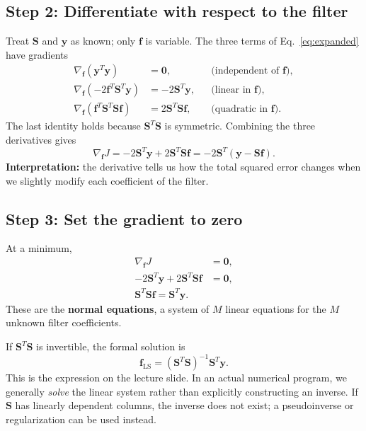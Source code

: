 \documentclass[11pt,letterpaper]{article}
\newcommand{\Smat}{\mathbf{S}}
\newcommand{\fvec}{\mathbf{f}}
\newcommand{\yvec}{\mathbf{y}}
\begin{document}
\subsection*{Step 2: Differentiate with respect to the filter}
Treat $\Smat$ and $\yvec$ as known; only $\fvec$ is variable.
The three terms of Eq.~\eqref{eq:expanded} have gradients
\begin{align}
\nabla_{\fvec}(\yvec^T\yvec)&=\mathbf{0},
&&\text{(independent of $\fvec$)},\\
\nabla_{\fvec}(-2\fvec^T\Smat^T\yvec)&=-2\Smat^T\yvec,
&&\text{(linear in $\fvec$)},\\
\nabla_{\fvec}(\fvec^T\Smat^T\Smat\fvec)&=2\Smat^T\Smat\fvec,
&&\text{(quadratic in $\fvec$)}.
\end{align}
The last identity holds because $\Smat^T\Smat$ is symmetric.
Combining the three derivatives gives
\begin{equation}
    \boxed{\nabla_{\fvec}J
    =-2\Smat^T\yvec+2\Smat^T\Smat\fvec
    =-2\Smat^T(\yvec-\Smat\fvec).}
    \label{eq:gradient}
\end{equation}
\textbf{Interpretation:} the derivative tells us how the total squared error
changes when we slightly modify each coefficient of the filter.

\subsection*{Step 3: Set the gradient to zero}
At a minimum,
\begin{align}
\nabla_{\fvec}J&=\mathbf{0},\\
-2\Smat^T\yvec+2\Smat^T\Smat\fvec&=\mathbf{0},\\
\boxed{\Smat^T\Smat\fvec=\Smat^T\yvec.}
\label{eq:normal}
\end{align}
These are the \textbf{normal equations}, a system of $M$ linear equations
for the $M$ unknown filter coefficients.

If $\Smat^T\Smat$ is invertible, the formal solution is
\begin{equation}
    \boxed{\fvec_{\mathrm{LS}}=(\Smat^T\Smat)^{-1}\Smat^T\yvec.}
    \label{eq:solution}
\end{equation}
This is the expression on the lecture slide. In an actual numerical program,
we generally \emph{solve} the linear system rather than explicitly constructing
an inverse. If $\Smat$ has linearly dependent columns, the inverse does not exist;
a pseudoinverse or regularization can be used instead.
\end{document}
